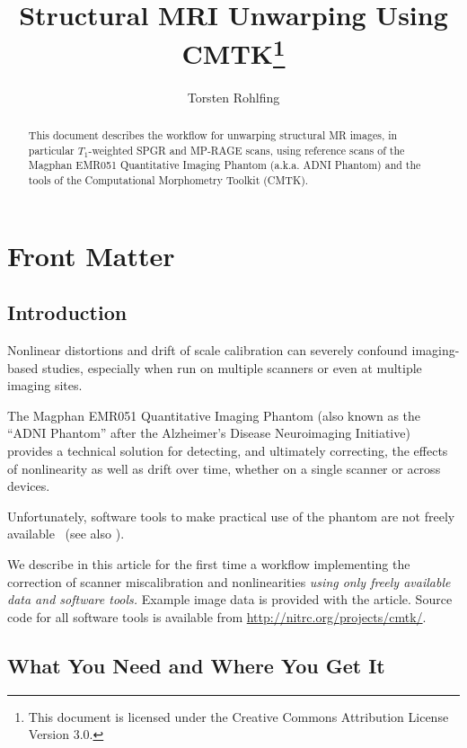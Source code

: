 \documentclass{InsightArticle}
\title{Structural MRI Unwarping Using CMTK\footnote{This document is licensed under
    the Creative Commons Attribution License Version 3.0.}}
\author{Torsten Rohlfing}
\begin{document}
\maketitle

\ifhtml
\chapter*{Front Matter\label{front}}
\fi


\begin{abstract}
\noindent This document describes the workflow for unwarping structural MR
images, in particular $T_1$-weighted SPGR and MP-RAGE scans, using reference
scans of the Magphan\textsuperscript{\textregistered} EMR051 Quantitative
Imaging Phantom (a.k.a. ADNI Phantom) and the tools of the Computational
Morphometry Toolkit (CMTK).
\end{abstract}

\tableofcontents

\clearpage
\section{Introduction}

Nonlinear distortions and drift of scale calibration can severely confound
imaging-based studies, especially when run on multiple scanners or even at
multiple imaging sites. 

The Magphan\textsuperscript{\textregistered} EMR051 Quantitative Imaging
Phantom (also known as the ``ADNI Phantom'' after the Alzheimer's Disease
Neuroimaging Initiative) provides a technical solution for detecting, and
ultimately correcting, the effects of nonlinearity as well as drift over time,
whether on a single scanner or across devices.

Unfortunately, software tools to make practical use of the phantom are not
freely available~\cite{GuntBernBoro:2009} (see also
\cite{RohlPoli:2012}).

We describe in this article for the first time a workflow implementing the
correction of scanner miscalibration and nonlinearities {\em using only freely
  available data and software tools.} Example image data is provided with the
article. Source code for all software tools is available from
\url{http://nitrc.org/projects/cmtk/}.

\section{What You Need and Where You Get It}
\end{document}
